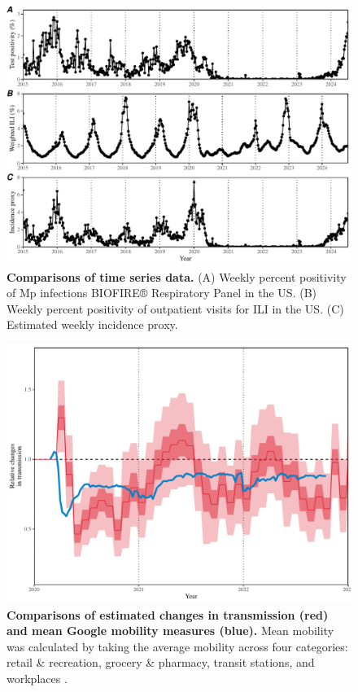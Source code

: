 \documentclass[12pt]{article}
\begin{document}
\begin{figure}[!ht]
\includegraphics[width=\textwidth]{../figure_timeseries/figure_timeseries.pdf}
\caption{
\textbf{Comparisons of time series data.}
(A) Weekly percent positivity of Mp infections BIOFIRE® Respiratory Panel in the US.
(B) Weekly percent positivity of outpatient visits for ILI in the US.
(C) Estimated weekly incidence proxy.
}
\end{figure}

\pagebreak

\begin{figure}[!ht]
\includegraphics[width=\textwidth]{../figure_mobility/figure_mobility_new.pdf}
\caption{
\textbf{Comparisons of estimated changes in transmission (red) and mean Google mobility measures (blue).}
Mean mobility was calculated by taking the average mobility across four categories: retail \& recreation, grocery \& pharmacy, transit stations, and workplaces \citep{park2024predicting}.
}
\end{figure}
\end{document}
